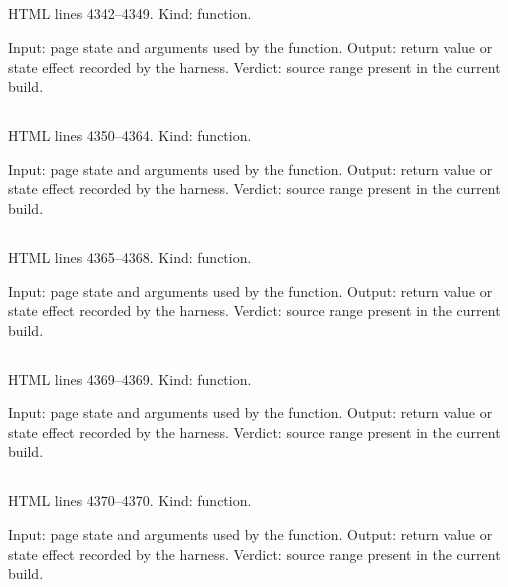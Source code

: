 \subsection*{\texttt{}}
\label{vf_160_sopMaybeSelectScDefault}
HTML lines 4342--4349. Kind: function.

Input: page state and arguments used by the function.
Output: return value or state effect recorded by the harness.
Verdict: source range present in the current build.

\subsection*{\texttt{}}
\label{vf_161_sopNormalise}
HTML lines 4350--4364. Kind: function.

Input: page state and arguments used by the function.
Output: return value or state effect recorded by the harness.
Verdict: source range present in the current build.

\subsection*{\texttt{}}
\label{vf_162_sopCanonical}
HTML lines 4365--4368. Kind: function.

Input: page state and arguments used by the function.
Output: return value or state effect recorded by the harness.
Verdict: source range present in the current build.

\subsection*{\texttt{}}
\label{vf_163_sopHash}
HTML lines 4369--4369. Kind: function.

Input: page state and arguments used by the function.
Output: return value or state effect recorded by the harness.
Verdict: source range present in the current build.

\subsection*{\texttt{}}
\label{vf_164_sopJSON}
HTML lines 4370--4370. Kind: function.

Input: page state and arguments used by the function.
Output: return value or state effect recorded by the harness.
Verdict: source range present in the current build.

